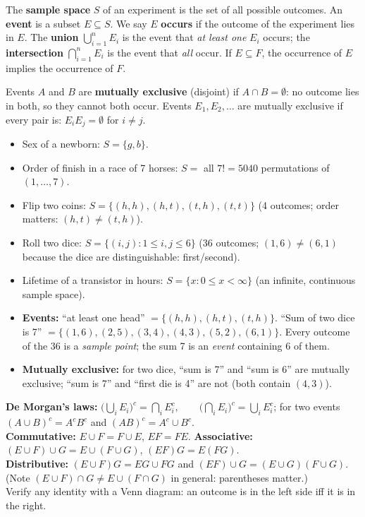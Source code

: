 \documentclass[11pt]{article}
\begin{document}
\begin{defbox}
The \textbf{sample space} $S$ of an experiment is the set of all possible outcomes. An \textbf{event} is a subset $E\subseteq S$. We say $E$ \textbf{occurs} if the outcome of the experiment lies in $E$. The \textbf{union} $\bigcup_{i=1}^nE_i$ is the event that \emph{at least one} $E_i$ occurs; the \textbf{intersection} $\bigcap_{i=1}^nE_i$ is the event that \emph{all} occur. If $E\subseteq F$, the occurrence of $E$ implies the occurrence of $F$.
\end{defbox}

\begin{defbox}
Events $A$ and $B$ are \textbf{mutually exclusive} (disjoint) if $A\cap B=\emptyset$: no outcome lies in both, so they cannot both occur. Events $E_1,E_2,\dots$ are mutually exclusive if every pair is: $E_iE_j=\emptyset$ for $i\ne j$.
\end{defbox}

\begin{exbox}
\begin{itemize}
\item Sex of a newborn: $S=\{g,b\}$.
\item Order of finish in a race of 7 horses: $S=$ all $7!=5040$ permutations of $(1,\dots,7)$.
\item Flip two coins: $S=\{(h,h),(h,t),(t,h),(t,t)\}$ (4 outcomes; order matters: $(h,t)\ne(t,h)$).
\item Roll two dice: $S=\{(i,j):1\le i,j\le6\}$ (36 outcomes; $(1,6)\ne(6,1)$ because the dice are distinguishable: first/second).
\item Lifetime of a transistor in hours: $S=\{x:0\le x<\infty\}$ (an infinite, continuous sample space).
\item \textbf{Events:} ``at least one head'' $=\{(h,h),(h,t),(t,h)\}$. ``Sum of two dice is 7'' $=\{(1,6),(2,5),(3,4),(4,3),(5,2),(6,1)\}$. Every outcome of the 36 is a \emph{sample point}; the sum 7 is an \emph{event} containing 6 of them.
\item \textbf{Mutually exclusive:} for two dice, ``sum is 7'' and ``sum is 6'' are mutually exclusive; ``sum is 7'' and ``first die is 4'' are not (both contain $(4,3)$).
\end{itemize}
\end{exbox}

\begin{thmbox}
\textbf{De Morgan's laws:}
$\displaystyle\Big(\bigcup_iE_i\Big)^c=\bigcap_iE_i^c,\qquad\Big(\bigcap_iE_i\Big)^c=\bigcup_iE_i^c$; for two events $(A\cup B)^c=A^cB^c$ and $(AB)^c=A^c\cup B^c$.\\
\textbf{Commutative:} $E\cup F=F\cup E$, $EF=FE$. \textbf{Associative:} $(E\cup F)\cup G=E\cup(F\cup G)$, $(EF)G=E(FG)$.\\
\textbf{Distributive:} $(E\cup F)G=EG\cup FG$ and $(EF)\cup G=(E\cup G)(F\cup G)$.\\
(Note $(E\cup F)\cap G\ne E\cup(F\cap G)$ in general: parentheses matter.)\\
Verify any identity with a Venn diagram: an outcome is in the left side iff it is in the right.
\end{thmbox}
\end{document}
